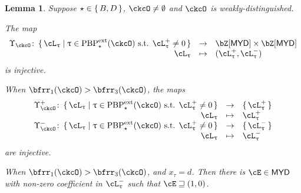 \documentclass[12pt,a4paper]{amsart}
\newcommand{\pr}{\mathrm{pr}}
\def\MYD{{\mathsf{MYD}}}
\numberwithin{equation}{section}
\newtheorem{lem}[thm]{Lemma}
\theoremstyle{remark}
\def\lsign{{}^l\mathrm{Sign}}
\def\PBPes{\mathrm{PBP}^{\mathrm{ext}}_{\star}}
\def\pUpsilon{\Upsilon^+}
\def\nUpsilon{\Upsilon^-}
\begin{document}
\begin{lem}\label{lem:BD3}
Suppose $\star \in \set{B,D}$, $\ckcO \neq \emptyset$ and $\ckcO$ is weakly-distinguished.
\begin{enuma}
    \item The map
    \begin{equation}\label{eq:up}
      \begin{array}{rcl}
        \Upsilon_{\ckcO} \colon \set{\ac_{\uptau}|\uptau\in \PBPes(\ckcO)
        \text{ s.t. } \pac{\uptau}\neq 0 }
        & \rightarrow &  \bZ[\MYD]\times \bZ[\MYD] \\ %
        \ac_{\uptau} &\mapsto & (\pac{\uptau},\nac{\uptau})
      \end{array}
    \end{equation}
    is injective.
  \item When $\bfrr_{1}(\ckcO)> \bfrr_{3}(\ckcO)$, the maps
    \[
      \begin{array}{rcl}
        \pUpsilon_{\ckcO} \colon \set{\ac_{\uptau}|\uptau\in \PBPes(\ckcO)
        \text{ s.t. } \pac{\uptau}\neq 0 } &\rightarrow  & \set{\pac{\uptau}}\\
       \ac_{\uptau} & \mapsto & \pac{\uptau}\\
        \nUpsilon_{\ckcO} \colon \set{\ac_{\uptau}|\uptau\in \PBPes(\ckcO)
        \text{ s.t. } \pac{\uptau}\neq 0} &\rightarrow & \set{\nac{\uptau}}\\
       \ac_{\uptau} &\mapsto & \nac{\uptau}
     \end{array}
   \]
    are injective.
    \item When $\bfrr_{1}(\ckcO)> \bfrr_{3}(\ckcO)$, and $x_{\tau}=d$.
    Then there is $\cE\in \MYD$ with non-zero coefficient in $\nac{\uptau}$ such that $\cE\sqsupseteq (1,0)$.
  \end{enuma}
\end{lem}


\end{document}
